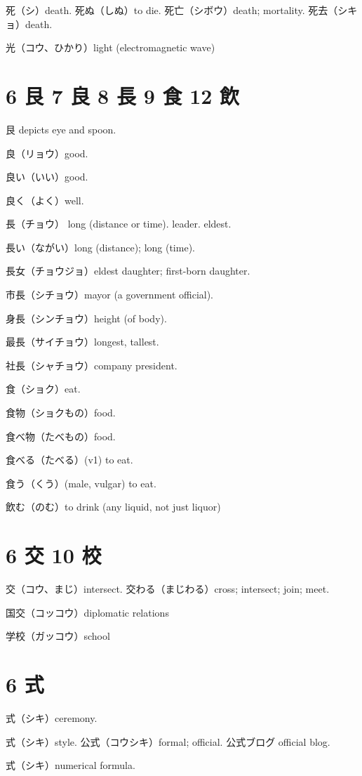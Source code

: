 死（シ）death.
死ぬ（しぬ）to die.
死亡（シボウ）death; mortality.
死去（シキョ）death.

光（コウ、ひかり）light (electromagnetic wave)

\section{6 艮 7 良 8 長 9 食 12 飲}

艮 depicts eye and spoon.

良（リョウ）good.

良い（いい）good.

良く（よく）well.

長（チョウ）
long (distance or time).
leader.
eldest.

長い（ながい）long (distance); long (time).

長女（チョウジョ）eldest daughter; first-born daughter.

市長（シチョウ）mayor (a government official).

身長（シンチョウ）height (of body).

最長（サイチョウ）longest, tallest.

社長（シャチョウ）company president.

食（ショク）eat.

食物（ショクもの）food.

食べ物（たべもの）food.

食べる（たべる）(v1) to eat.

食う（くう）(male, vulgar) to eat.

飲む（のむ）to drink (any liquid, not just liquor)

\section{6 交 10 校}

交（コウ、まじ）intersect.
交わる（まじわる）cross; intersect; join; meet.

国交（コッコウ）diplomatic relations

学校（ガッコウ）school

\section{6 式}

式（シキ）ceremony.

式（シキ）style.
公式（コウシキ）formal; official.
公式ブログ official blog.

式（シキ）numerical formula.

